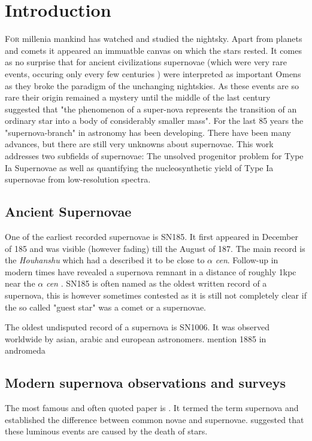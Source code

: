 \chapter{Introduction}
\label{chap:intro}

\lettrine[lines=4]{F}{or} millenia mankind has watched and studied the nightsky. Apart from planets and comets it appeared an immuatble canvas on which the stars rested. It comes as no surprise that for ancient civilizations supernovae (which were very rare events, occuring only every few centuries ) were interpreted as important Omens as they broke the paradigm of the unchanging nightskies. As these events are so rare their origin remained a mystery until the middle of the last century \citet{1934PNAS...20..254B} suggested that "the phenomenon of a super-nova represents the transition of an ordinary star into a body of considerably smaller mass". For the last 85 years the "supernova-branch" in astronomy has been developing. There have been many advances, but there are still very unknowns about supernovae. This work addresses two subfields of supernovae: The unsolved progenitor problem for Type Ia Supernovae as well as quantifying the nucleosynthetic yield of Type Ia supernovae from low-resolution spectra.


\section{Ancient Supernovae}
\label{sec:ancientsn}

One of the earliest recorded supernovae is SN185. It first appeared in December of 185 and was visible (however fading) till the August of 187. The main record is the \textit{Houhanshu} \citep{2006ChJAA...6..635Z} which had a described it to be close to $\alpha$ \textit{cen}. Follow-up in modern times have revealed a supernova remnant in a distance of roughly 1\;kpc near the $\alpha$ \textit{cen} \citep{2006ChJAA...6..635Z}. SN185 is often named as the oldest written record of a supernova, this is however sometimes contested as it is still not completely clear if the so called "guest star" was a comet or a supernovae. 

The oldest undisputed record of a supernova is SN1006. It was observed worldwide by asian, arabic and european astronomers. 
mention 1885 in andromeda\cite{1885AN....112..360H}


\section{Modern supernova observations and surveys}
\label{sec:}
The most famous and often quoted paper is \citet{1934PNAS...20..254B}. It termed the term supernova and established the difference between common novae and supernovae. \citet{1934PNAS...20..254B} suggested that these luminous events are caused by the death of stars. 

